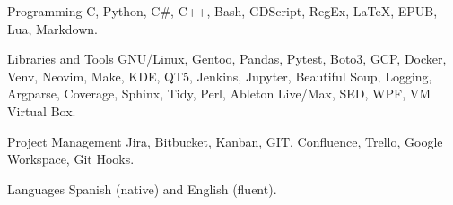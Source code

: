 

\begin{cvskills}

  \cvskill
    {Programming} %
    {C, Python, C\#, C++, Bash, GDScript, RegEx, LaTeX, EPUB, Lua, Markdown.} %

  \cvskill
    {Libraries and Tools}
    {GNU/Linux, Gentoo, Pandas, Pytest, Boto3, GCP, Docker, Venv, Neovim, Make, KDE, QT5, Jenkins, Jupyter,}
  \cvskill
    {}
    {Beautiful Soup, Logging, Argparse, Coverage, Sphinx, Tidy, Perl, Ableton Live/Max, SED, WPF, VM Virtual Box.}

  \cvskill
    {Project Management}
    {Jira, Bitbucket, Kanban, GIT, Confluence, Trello, Google Workspace, Git Hooks.}

  \cvskill
    {Languages}
    {Spanish (native) and English (fluent).}


\end{cvskills}
